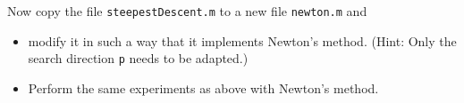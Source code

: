 Now copy the file \texttt{steepestDescent.m} to a new file \texttt{newton.m}
and
\begin{itemize}
  \item modify it in such a way that it implements Newton's method.  (Hint:
    Only the search direction \texttt{p} needs to be adapted.)
  \item Perform the same experiments as above with Newton's method.
\end{itemize}



